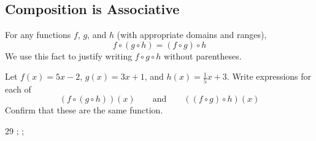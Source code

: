 \subsection{Composition is Associative} 
\begin{fact}
For any functions $f$, $g$, and $h$ (with appropriate domains and ranges),
$$f\circ(g\circ h)=(f\circ g)\circ h$$
We use this fact to justify writing $f\circ g\circ h$ without parentheses.
\end{fact}
\begin{Example}Let $f(x)=5x-2$, $g(x)=3x+1$, and $h(x)=\frac{1}{5}x+3$. Write expressions for each of
$$(f\circ(g\circ h))(x) \qquad \mbox{and} \qquad ((f\circ g)\circ h)(x)$$
Confirm that these are the same function.
\begin{lpicvsplit}{2}{9}
;
;
\end{lpicvsplit}
\end{Example}